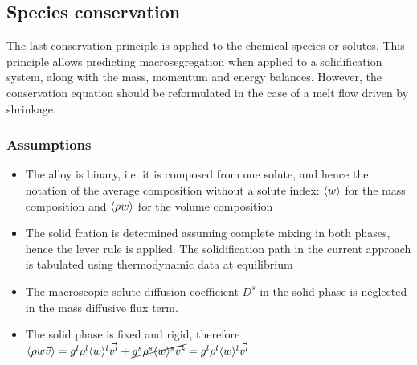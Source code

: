 \subsection{Species conservation}
The last conservation principle is applied to the chemical species or solutes. This principle allows predicting
macrosegregation when applied to a solidification system, along with the mass, momentum and energy balances.
However, the conservation equation should be reformulated in the case of a melt flow driven by shrinkage.
\subsubsection{Assumptions}
\begin{itemize}
\itemsep0em
\item The alloy is binary, i.e. it is composed from one solute, and hence the notation of the average composition
		without a solute index: $\langle w \rangle$ for the mass composition and $\langle \rho w \rangle$ for the volume composition
\item The solid fration is determined assuming complete mixing in both phases, hence the lever rule is applied. 
	  The solidification path in the current approach is tabulated using thermodynamic data at equilibrium
\item The macroscopic solute diffusion coefficient $D^s$ in the solid phase is neglected in the mass diffusive flux term.
\item The solid phase is fixed and rigid, therefore $\langle \rho w \vec{v} \rangle = {g^l} \rho^l \langle w \rangle^l \vec{v^l} +  \cancel{{g^s} \rho^s \langle w \rangle^s \vec{v^s}} = {g^l} \rho^l \langle w \rangle^l \vec{v^l}$ 
\end{itemize}
